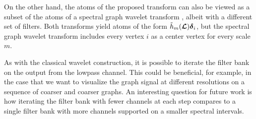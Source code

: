 \documentclass[journal, 10pt]{IEEEtran}
\begin{document}
On the other hand, the atoms of the proposed transform can also be viewed as a subset of the atoms of a spectral graph wavelet transform  \cite{hammond2011wavelets}, albeit with a different set of filters. Both transforms yield atoms of the form $\tilde{h}_m(\boldsymbol{\mathcal{L}}){\boldsymbol \delta}_i$, but the spectral graph wavelet transform includes every vertex $i$ as a center vertex for every scale $m$. 

As with the classical wavelet construction, it is possible to iterate the filter bank on the output from the lowpass channel.
This could be beneficial, for example, in the case that we want to visualize the graph signal at different resolutions on  a sequence of coarser and coarser graphs. An interesting question for future work is how iterating the filter bank with fewer channels at each step compares to a single filter bank with more channels %
supported on a smaller spectral intervals. %
\end{document}
